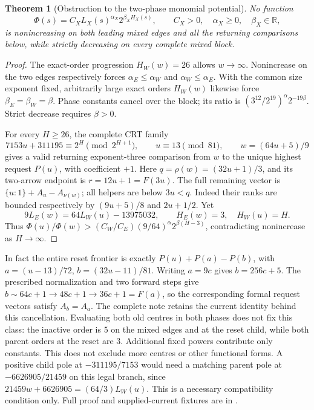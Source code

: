 \documentclass[11pt]{article}
\newtheorem{theorem}{Theorem}
\begin{document}
\begin{theorem}[Obstruction to the two-phase monomial potential]
\label{thm:valuationdebt}
No function
\[
 \Phi(s)=C_X L_X(s)^{\alpha_X}2^{\beta_X H_X(s)},
 \qquad C_X>0,\quad \alpha_X\geq0,\quad \beta_X\in\mathbb R,
\]
is nonincreasing on both leading mixed edges and all the returning
comparisons below, while strictly decreasing on every complete mixed block.
\end{theorem}
\begin{proof}
The exact-order progression $H_W(w)=26$ allows $w\to\infty$.
Nonincrease on the two edges respectively forces
$\alpha_E\leq\alpha_W$ and $\alpha_W\leq\alpha_E$. With the common
size exponent fixed, arbitrarily large exact orders $H_W(w)$ likewise
force $\beta_E=\beta_W=\beta$. Phase constants cancel over the block;
its ratio is $(3^{12}/2^{19})^\alpha2^{-19\beta}$. Strict decrease
requires $\beta>0$.

For every $H\geq26$, the complete CRT family
\[
 7153u+311195\equiv2^H\pmod {2^{H+1}},\qquad u\equiv13\pmod {81},
 \qquad w=(64u+5)/9
\]
gives a valid returning exponent-three comparison from $w$ to the
unique highest request $P(u)$, with coefficient $+1$.
Here $q=\rho(w)=(32u+1)/3$, and its two-arrow endpoint is
$r=12u+1=F(3u)$. The full remaining vector is
$\{u:1\}+A_u-A_{\nu(w)}$; all helpers are below $3u<q$.
Indeed their ranks are bounded respectively by $(9u+5)/8$ and
$2u+1/2$. Yet
\[
 9L_E(w)=64L_W(u)-13975032,\qquad
 H_E(w)=3,\quad H_W(u)=H.
\]
Thus $\Phi(u)/\Phi(w)>(C_W/C_E)(9/64)^\alpha2^{\beta(H-3)}$,
contradicting nonincrease as $H\to\infty$.
\end{proof}
In fact the entire reset frontier is exactly
$P(u)+P(a)-P(b)$, with $a=(u-13)/72$, $b=(32u-11)/81$.
Writing $a=9c$ gives $b=256c+5$. The prescribed normalization and
two forward steps give $b\sim64c+1\to48c+1\to36c+1=F(a)$,
so the corresponding formal request vectors satisfy $A_b=A_a$.
The complete note retains the current identity behind this cancellation.
Evaluating both old centres in both phases does not fix this class:
the inactive order is $5$ on the mixed edges and at the reset child,
while both parent orders at the reset are $3$. Additional fixed powers
contribute only constants. This does not exclude more centres or other
functional forms. A positive child pole at $-311195/7153$ would need
a matching parent pole at $-6626905/21459$ on this legal branch, since
$21459w+6626905=(64/3)L_W(u)$. This is a necessary compatibility
condition only. Full proof and supplied-current fixtures are in
.
\end{document}
